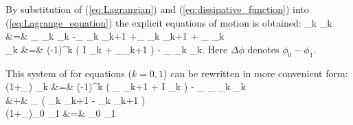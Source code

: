 By substitution of (\ref{eq:Lagrangian}) and (\ref{eq:dissipative_function}) into (\ref{eq:Lagrange_equation}) the explicit equations of motion is obtained:
\bea
\label{eq:equation_of_motion}
\sin \theta_k \dot{\phi}_k &=&
	\omega_ \sin \theta_k \cos \theta_k
	-\Delta\omega_ \sin \theta_k \cos \theta_{k+1}
	+\Delta\omega_ \cos\theta_k \sin\theta_{k+1} \cos\Delta\phi
	+ \alpha_ \dot{\theta}_k \nn \\
\dot{\theta}_k &=&
	(-1)^k
	\left(
		\epsilon\sigma I \sin\theta_k
		+ \Delta\omega_\sin\theta_{k+1}\sin\Delta\phi
	\right)
	- \alpha_ \sin\theta_k \dot{\phi}_k.
\eea
Here $\Delta\phi$ denotes $\phi_0 - \phi_1$.

This system of for equations ($k = 0, 1$) can be rewritten in more convenient form:
\bea
\label{eq:equation_of_motion1}
(1+\alpha_) \dot{\theta}_k &=& (-1)^k
	\left(
		\Delta\omega_ \sin\theta_{k+1} \sin\Delta\phi
		+ \epsilon \sigma I \sin\theta_k
	\right)
	- \alpha_ \omega_ \sin\theta_k \cos\theta_k \nn \\
	&+& \alpha \Delta\omega_
	\left(
		\sin\theta_k \cos\theta_{k+1}
		- \cos\theta_k \sin\theta_{k+1} \cos\Delta\phi
	\right) \nn \\
(1+\alpha_)\sin\theta_0 \sin\theta_1 \dot{\Delta\phi} &=&
		\sin\theta_0 \sin\theta_1 
	
\eea



